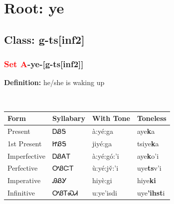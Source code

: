\needspace{4in}
\section*{Root: ye}
\nopagebreak
{}
\needspace{3in}
\subsection*{Class: g-ts[inf2]}
\nopagebreak
\needspace{2in}
\subsubsection*{\textcolor{Red}{Set A}{-}\textbf{ye}{-}[g-ts[inf2]]}
\nopagebreak
\textbf{Definition: } he/she is waking up
\\[0.5em]
\begin{tabularx}{\textwidth}{l X X X}%
\toprule%
\textbf{Form}&\textbf{Syllabary}&\textbf{With Tone}&\textbf{Toneless}\\%
\midrule%
Present&ᎠᏰᎦ&à:yé:ga&aye\textbf{k}a\\%
1st Present&ᏥᏰᎦ&jiyé:ga&tsiye\textbf{k}a\\%
Imperfective&ᎠᏰᎪᎢ&à:yé:gó:’i&aye\textbf{k}o'i\\%
Perfective&ᎤᏰᏨᎢ&ù:yé:jv̌:’i&uye\textbf{ts}v'i\\%
Imperative&ᎯᏰᎩ&hiyè:gi&hiye\textbf{ki}\\%
Infinitive&ᎤᏰᎢᏍᏗ&u:ye’isdi&uye\textbf{'ihst}i\\%
\bottomrule%
\end{tabularx}
\\[1em]